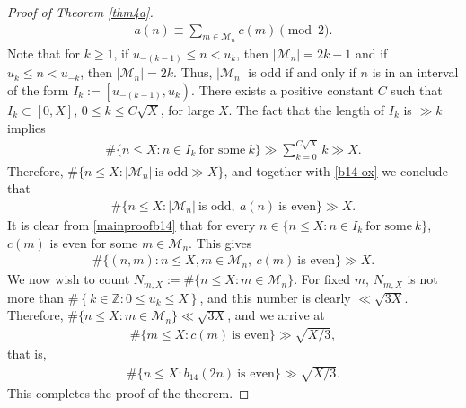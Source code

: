 \documentclass[reqno]{amsart}
\theoremstyle{definition}
\theoremstyle{remark}
\numberwithin{equation}{section}
\begin{document}
\begin{proof}[Proof of Theorem \ref{thm4a}]
\begin{align}\label{mainproofb14}
a(n)\equiv \sum_{m\in \mathcal{M}_n}c(m)\pmod{2}.
\end{align}
Note that for $k\geq1$, if $u_{-(k-1)}\leq n< u_k$, then $|\mathcal{M}_n|=2k-1$ and if $u_{k}\leq n< u_{-k}$, then $|\mathcal{M}_n|=2k$. Thus, $|\mathcal{M}_n|$ is odd if and only if $n$ is in an interval of the form $I_{k}:=\left[u_{-(k-1)},u_{k}\right)$. 
There exists a positive constant $C$ such that $I_{k}\subset\left[0,X \right] $, $0\leq k\leq C\sqrt{X}$, for large $X$. The fact that the length of $I_{k}$ is $\gg k$ implies
\begin{align*}
\#\{n\leq X: n\in I_k\ \text{for some}\ k\}\gg \sum_{k=0}^{C\sqrt{X}}k\gg X.
\end{align*}
Therefore, $\#\{n\leq X: |\mathcal{M}_n|\ \text{is odd}\gg X\}$, and together with \eqref{b14-ox} we conclude that 
\begin{align*}
\#\{n\leq X: |\mathcal{M}_n|\ \text{is odd},\ a(n)\ \text{is even}\}\gg X.
\end{align*}
It is clear from \eqref{mainproofb14} that for every $n\in \{ n\leq X :n\in I_k\  \text{for some}\  k\}$, $c(m)$ is even for some $m\in \mathcal{M}_n$. This gives
\begin{align*}
\#\{(n, m): n\leq X, m\in \mathcal{M}_n, \ c(m)\ \text{is even}\}\gg X.
\end{align*}
We now wish to count $N_{m, X}:=\#\{ n\leq X: m\in \mathcal{M}_n \}$. For fixed $m$, $N_{m, X}$ is not more than $\#\left\lbrace k\in\mathbb{Z}: 0\leq u_k\leq X \right\rbrace$, and this number is clearly $\ll \sqrt{3X}$. 
Therefore, $\#\{ n\leq X: m\in \mathcal{M}_n \} \ll \sqrt{3X}$, and we arrive at
\begin{align*}
\#\{m\leq X: c(m)\ \text{is even}\}\gg \sqrt{X/3},
\end{align*}
that is, 
\begin{align*}
\#\{n\leq X: b_{14}(2n)\ \text{is even}\}\gg \sqrt{X/3}.
\end{align*}
This completes the proof of the theorem.
\end{proof}
\end{document}
